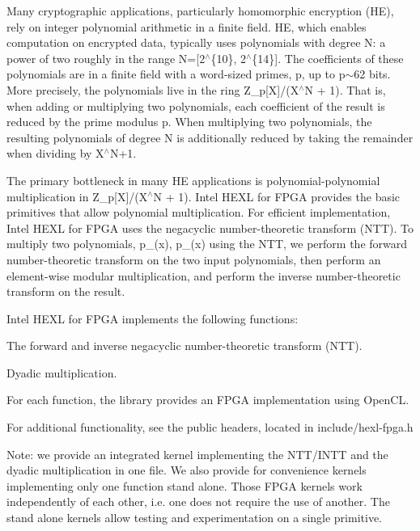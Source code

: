 Many cryptographic applications, particularly homomorphic encryption (H\-E), rely on integer polynomial arithmetic in a finite field. H\-E, which enables computation on encrypted data, typically uses polynomials with degree {\ttfamily N\-:} a power of two roughly in the range {\ttfamily N=\mbox{[}2$^\wedge$\{10\}, 2$^\wedge$\{14\}\mbox{]}}. The coefficients of these polynomials are in a finite field with a word-\/sized primes, {\ttfamily p}, up to {\ttfamily p}$\sim$62 bits. More precisely, the polynomials live in the ring {\ttfamily Z\-\_\-p\mbox{[}X\mbox{]}/(X$^\wedge$\-N + 1)}. That is, when adding or multiplying two polynomials, each coefficient of the result is reduced by the prime modulus {\ttfamily p}. When multiplying two polynomials, the resulting polynomials of degree {\-N} is additionally reduced by taking the remainder when dividing by {\ttfamily X$^\wedge$\-N+1}.

The primary bottleneck in many H\-E applications is polynomial-\/polynomial multiplication in {\ttfamily Z\-\_\-p\mbox{[}X\mbox{]}/(X$^\wedge$\-N + 1)}. Intel H\-E\-X\-L for F\-P\-G\-A provides the basic primitives that allow polynomial multiplication. For efficient implementation, Intel H\-E\-X\-L for F\-P\-G\-A uses the negacyclic number-\/theoretic transform (N\-T\-T). To multiply two polynomials, {\ttfamily p\-\_(x), p\-\_(x)} using the N\-T\-T, we perform the forward number-\/theoretic transform on the two input polynomials, then perform an element-\/wise modular multiplication, and perform the inverse number-\/theoretic transform on the result.

Intel H\-E\-X\-L for F\-P\-G\-A implements the following functions\-:
\begin{DoxyItemize}
\item The forward and inverse negacyclic number-\/theoretic transform (N\-T\-T).
\item Dyadic multiplication.
\end{DoxyItemize}

For each function, the library provides an F\-P\-G\-A implementation using Open\-C\-L.

For additional functionality, see the public headers, located in {\ttfamily include/hexl-\/fpga.\-h}

Note\-: we provide an integrated kernel implementing the N\-T\-T/\-I\-N\-T\-T and the dyadic multiplication in one file. We also provide for convenience kernels implementing only one function stand alone. Those F\-P\-G\-A kernels work independently of each other, i.\-e. one does not require the use of another. The stand alone kernels allow testing and experimentation on a single primitive.

